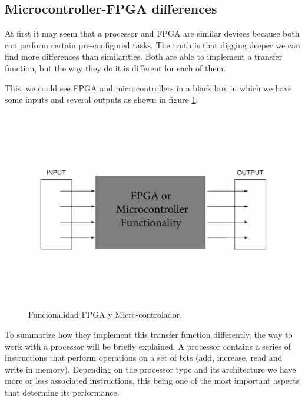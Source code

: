 \subsection{Microcontroller-FPGA differences}
At first it may seem that a processor and FPGA are similar devices because both can perform certain pre-configured tasks. The truth is that digging deeper we can find more differences than similarities. Both are able to implement a transfer function, but the way they do it is different for each of them.\newline

This, we could see FPGA and microcontrollers in a black box in which we have some inputs and several outputs as shown in figure \ref{fig:funcionalidad_FPGA_micro}.\newline


\begin{figure}[H]
	\center
	\includegraphics[trim = 0mm 30mm 0mm 30mm, clip,scale=0.4]{imagenes/EstadoArte/funcionalidad_FPGA_micro.pdf}
	\caption{Funcionalidad FPGA y Micro-controlador.}
	\label{fig:funcionalidad_FPGA_micro}
\end{figure}

To summarize how they implement this transfer function differently, the way to work with a processor will be briefly explained. \newline
A processor contains a series of instructions that perform operations on a set of bits (add, increase, read and write in memory). Depending on the processor type and its architecture we have more or less associated instructions, this being one of the most important aspects that determine its performance. 

